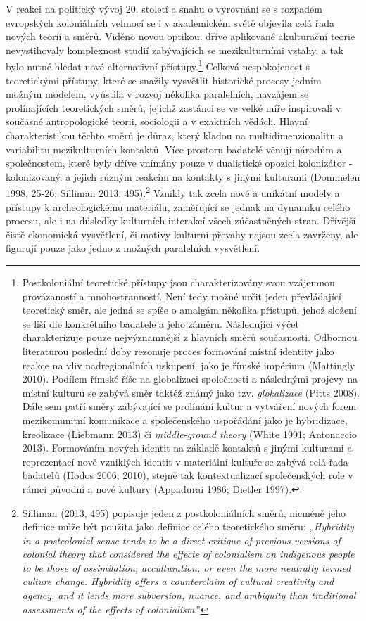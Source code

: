V reakci na politický vývoj 20. století a snahu o vyrovnání se s rozpadem evropských koloniálních velmocí se i v akademickém světě objevila celá řada nových teorií a směrů. Viděno novou optikou, dříve aplikované akulturační teorie nevystihovaly komplexnost studií zabývajících se mezikulturními vztahy, a tak bylo nutné hledat nové alternativní přístupy.\footnote{Postkoloniální teoretické přístupy jsou charakterizovány svou vzájemnou provázaností a mnohostranností. Není tedy možné určit jeden převládající teoretický směr, ale jedná se spíše o amalgám několika přístupů, jehož složení se liší dle konkrétního badatele a jeho záměru. Následující výčet charakterizuje pouze nejvýznamnější z hlavních směrů současnosti. Odbornou literaturou poslední doby rezonuje proces formování místní identity jako reakce na vliv nadregionálních uskupení, jako je římské impérium (Mattingly 2010). Podílem římské říše na globalizaci společnosti a následnými projevy na místní kulturu se zabývá směr taktéž známý jako tzv. {\em glokalizace} (Pitts 2008). Dále sem patří směry zabývající se prolínání kultur a vytváření nových forem mezikomunitní komunikace a společenského uspořádání jako je hybridizace, kreolizace (Liebmann 2013) či {\em middle-ground theory} (White 1991; Antonaccio 2013). Formováním nových identit na základě kontaktů s jinými kulturami a reprezentací nově vzniklých identit v materiální kultuře se zabývá celá řada badatelů (Hodos 2006; 2010), stejně tak kontextualizací společenských role v rámci původní a nové kultury (Appadurai 1986; Dietler 1997).} Celková nespokojenost s teoretickými přístupy, které se snažily vysvětlit historické procesy jedním možným modelem, vyústila v rozvoj několika paralelních, navzájem se prolínajících teoretických směrů, jejichž zastánci se ve velké míře inspirovali v současné antropologické teorii, sociologii a v exaktních vědách. Hlavní charakteristikou těchto směrů je důraz, který kladou na multidimenzionalitu a variabilitu mezikulturních kontaktů. Více prostoru badatelé věnují národům a společnostem, které byly dříve vnímány pouze v dualistické opozici kolonizátor - kolonizovaný, a jejich různým reakcím na kontakty s jinými kulturami (Dommelen 1998, 25-26; Silliman 2013, 495).\footnote{Silliman (2013, 495) popisuje jeden z postkoloniálních směrů, nicméně jeho definice může být použita jako definice celého teoretického směru: „{\em Hybridity in a postcolonial sense tends to be a direct critique of previous versions of colonial theory that considered the effects of colonialism on indigenous people to be those of assimilation, acculturation, or even the more neutrally termed culture change. Hybridity offers a counterclaim of cultural creativity and agency, and it lends more subversion, nuance, and ambiguity than traditional assessments of the effects of colonialism}.”} Vznikly tak zcela nové a unikátní modely a přístupy k archeologickému materiálu, zaměřující se jednak na dynamiku celého procesu, ale i na důsledky kulturních interakcí všech zúčastněných stran. Dřívější čistě ekonomická vysvětlení, či motivy kulturní převahy nejsou zcela zavrženy, ale figurují pouze jako jedno z možných paralelních vysvětlení.

